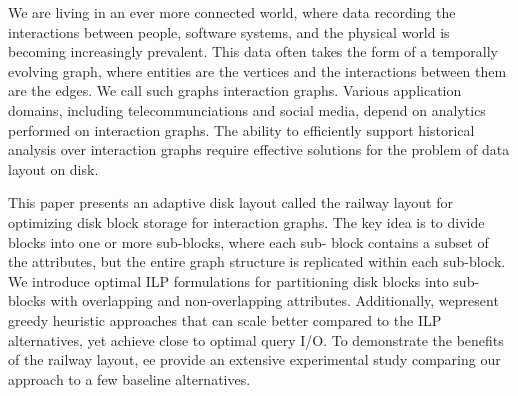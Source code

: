 We are living in an ever more connected world, where data recording the
interactions between people, software systems, and the physical world is
becoming increasingly prevalent. This data often takes the form of a temporally
evolving graph, where entities are the vertices and the interactions between
them are the edges. We call such graphs interaction graphs. Various application
domains, including telecommunciations and social media, depend on analytics
performed on interaction graphs. The ability to efficiently support historical
analysis over interaction graphs require effective solutions for the problem of
data layout on disk. 

This paper presents an adaptive disk layout called the railway layout for
optimizing disk block storage for interaction graphs. The key idea is to divide
blocks into one or more sub-blocks, where each sub- block contains a subset of
the attributes, but the entire graph structure is replicated within each
sub-block.  We introduce optimal ILP formulations for partitioning disk blocks
into sub-blocks with overlapping and non-overlapping attributes. Additionally,
wepresent greedy heuristic approaches that can scale better compared to the ILP
alternatives, yet achieve close to optimal query I/O. To demonstrate the
benefits of the railway layout, ee provide an extensive experimental study
comparing our approach to a few baseline alternatives.